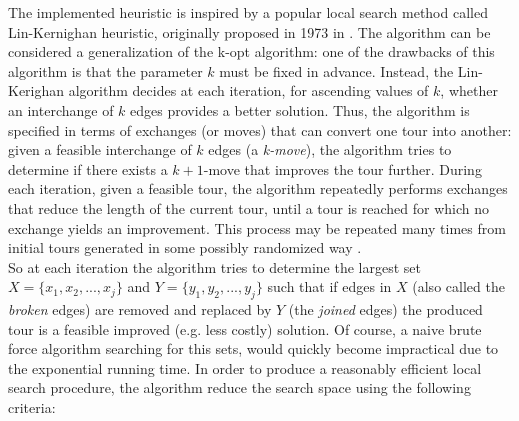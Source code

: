 The implemented heuristic is inspired by a popular local search method called Lin-Kernighan heuristic, originally proposed in 1973 in \cite{LinK73}. The algorithm can be considered a generalization of the k-opt algorithm: one of the drawbacks of this algorithm is that the parameter $k$ must be fixed in advance. Instead, the Lin-Kerighan algorithm decides at each iteration, for ascending values of $k$, whether an interchange of $k$ edges provides a better solution. Thus, the algorithm is specified in terms of exchanges (or moves) that can convert one tour into another: given a feasible interchange of $k$ edges (a \textit{k-move}), the algorithm tries to determine if there exists a $k+1$-move that improves the tour further. 
During each iteration, given a feasible tour, the algorithm repeatedly performs exchanges that reduce the length of the current tour, until a tour is reached for which no exchange yields an improvement. This process may be repeated many times from initial tours generated in some possibly randomized way \cite{Helsgaun2000}.\\
So at each iteration the algorithm tries to determine the largest set $X=\{x_1, x_2, ..., x_j\}$ and $Y=\{y_1, y_2, ..., y_j\}$ such that if edges in $X$ (also called the \emph{broken} edges) are removed and replaced by $Y$ (the \emph{joined} edges) the produced tour is a feasible improved (e.g. less costly) solution. Of course, a naive brute force algorithm searching for this sets, would quickly become impractical due to the exponential running time. In order to produce a reasonably efficient local search procedure, the algorithm reduce the search space using the following criteria:
